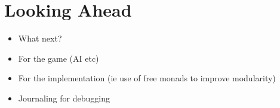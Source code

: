 \section{Looking Ahead}

\begin{itemize}
    \item What next?
    \item For the game (AI etc)
    \item For the implementation (ie use of free monads to improve modularity)
    \item Journaling for debugging
\end{itemize}